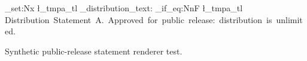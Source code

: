 \documentclass[letterpaper]{article}
\begin{document}
\ExplSyntaxOn
\tl_set:Nx \l_tmpa_tl {\ls_distribution_text:}
\tl_if_eq:NnF \l_tmpa_tl
  {Distribution~Statement~A.~Approved~for~public~release:~distribution~is~unlimited.}
  {\PackageError{linearspace-test}{Statement~A~wording~regression}{}}
\ExplSyntaxOff
\LSMarkingNotices
Synthetic public-release statement renderer test.
\end{document}
